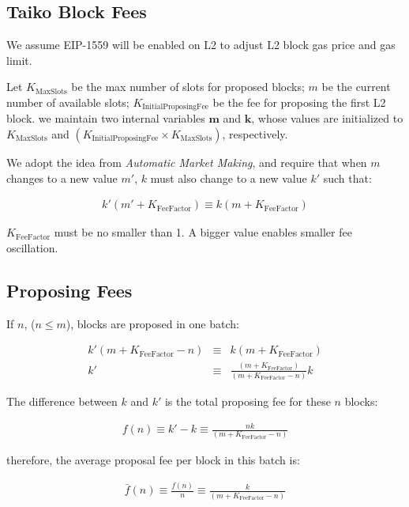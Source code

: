 \documentclass[9pt,oneside]{amsart}
\begin{document}
\setlength{\columnsep}{20pt}
\begin{multicols}{2}


\section{Taiko Block Fees}
We assume EIP-1559 will be enabled on L2 to adjust L2 block gas price and gas limit.

Let $K_{\mathrm{MaxSlots}}$ be the max number of slots for proposed blocks; $m$ be the current number of available slots; $K_{\mathrm{InitialProposingFee}}$ be the fee for proposing the first L2 block. we maintain two internal variables $\boldsymbol{m}$ and $\boldsymbol{k}$, whose values are initialized to $K_{\mathrm{MaxSlots}}$ and $(K_{\mathrm{InitialProposingFee}} \times K_{\mathrm{MaxSlots}})$, respectively.

We adopt the idea from \textit{Automatic Market Making}, and require that when $m$ changes to a new value $m'$, $k$ must also change to a new value $k'$ such that:

\begin{eqnarray}
k'(m'+K_{\mathrm{FeeFactor}}) \equiv k(m+K_{\mathrm{FeeFactor}})
\end{eqnarray}

$K_{\mathrm{FeeFactor}}$ must be no smaller than 1. A bigger value enables smaller fee oscillation.

\subsection{Proposing Fees}
If $n$, ($n \leq m$), blocks are proposed in one batch:

\begin{eqnarray}
k'(m+K_{\mathrm{FeeFactor}}-n)  &  \equiv  &  k(m+K_{\mathrm{FeeFactor}}) \\
k'  & \equiv & \frac{(m+K_{\mathrm{FeeFactor}})}{(m+K_{\mathrm{FeeFactor}}-n)}k
\end{eqnarray}

The difference between $k$ and $k'$ is the total proposing fee for these $n$ blocks:

\begin{eqnarray}
f(n)  \equiv  k' - k  \equiv   \frac{nk}{(m+K_{\mathrm{FeeFactor}}-n)}
\end{eqnarray}

therefore, the average proposal fee per block in this batch is:

\begin{eqnarray}
\bar{f}(n)   \equiv \frac{f(n)}{n} \equiv \frac{k}{(m+K_{\mathrm{FeeFactor}}-n)}
\end{eqnarray}



\end{multicols}
\end{document}
